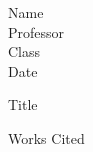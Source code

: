 \documentclass[12pt]{article}
\newcommand{\bibent}{\noindnet \hangindent 40pt}
\newenvironment{workscited}{\newpage \begin{center} Works Cited \end{center}}{\newpage }
\begin{document}
    \begin{flushleft}
Name \\
Professor \\
Class \\
Date \\
\begin{center}
Title
\end{center}
\setlength{\parindent}{0.5in}

\begin{workscited}
    \bibent
\end{workscited}
\end{flushleft}
\end{document}
